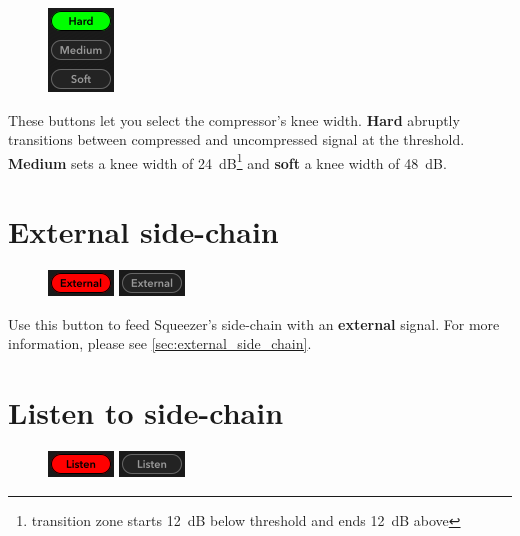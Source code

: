 \begin{figure}
  \includegraphics[scale=\screenshotscale,clip]{include/images/buttons_knee_width.png}
\end{figure}

These buttons let you select the compressor's knee width.
\textbf{Hard} abruptly transitions between compressed and uncompressed
signal at the threshold.  \textbf{Medium} sets a knee width of
\SI{24}{\dB}\footnote{transition zone starts \SI{12}{\dB} below
  threshold and ends \SI{12}{\dB} above} and \textbf{soft} a knee
width of \SI{48}{\dB}.

\section{External side-chain}

\begin{figure}
  \includegraphics[scale=\screenshotscale,clip]{include/images/button_sidechain_external_on.png}
  \newline \vspace{-0.9\baselineskip}
  \includegraphics[scale=\screenshotscale,clip]{include/images/button_sidechain_external_off.png}
\end{figure}

Use this button to feed Squeezer's side-chain with an
\textbf{external} signal.  For more information, please see
\ref{sec:external_side_chain}.

\section{Listen to side-chain}

\begin{figure}
  \includegraphics[scale=\screenshotscale,clip]{include/images/button_sidechain_listen_on.png}
  \newline \vspace{-0.9\baselineskip}
  \includegraphics[scale=\screenshotscale,clip]{include/images/button_sidechain_listen_off.png}
\end{figure}

